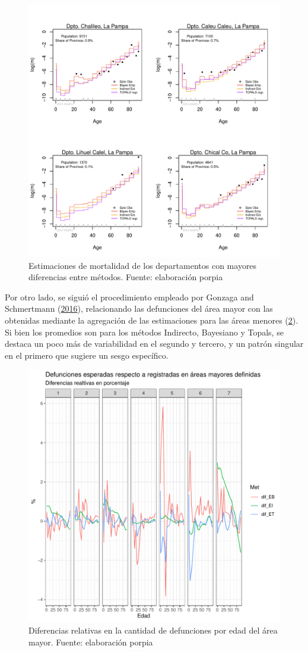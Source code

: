 \documentclass[12pt,]{article}
\begin{document}
\begin{figure}

{\centering \includegraphics[width=0.7\linewidth]{analysis/plots/AjusteFeos} 

}

\caption{Estimaciones de mortalidad de los departamentos con mayores diferencias entre métodos. Fuente: elaboración porpia}\label{fig:Feos}
\end{figure}

Por otro lado, se siguió el procedimiento empleado por Gonzaga and
Schmertmann (\protect\hyperlink{ref-Gonzaga_Schmertmann_2016}{2016}),
relacionando las defunciones del área mayor con las obtenidas mediante
la agregación de las estimaciones para las áreas menores
(\ref{fig:consistAM}). Si bien los promedios son para los métodos
Indirecto, Bayesiano y Topals, se destaca un poco más de variabilidad en
el segundo y tercero, y un patrón singular en el primero que sugiere un
sesgo específico.

\begin{figure}

{\centering \includegraphics[width=0.7\linewidth]{analysis/plots/ConsistAM} 

}

\caption{Diferencias relativas en la cantidad de defunciones por edad del área mayor. Fuente: elaboración porpia}\label{fig:consistAM}
\end{figure}
\end{document}
